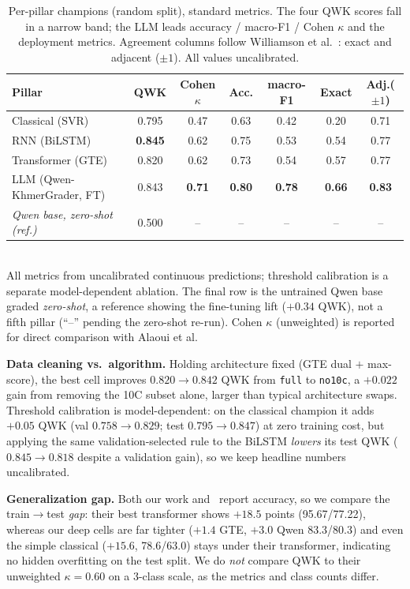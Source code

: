 \documentclass[journal]{IEEEtran}
\begin{document}
\begin{table}[t]
\caption{Per-pillar champions (random split), standard metrics. The four QWK scores fall in a
narrow band; the LLM leads accuracy / macro-F1 / Cohen $\kappa$ and the deployment metrics.
Agreement columns follow Williamson et al.~\cite{williamson2012framework}: exact and adjacent
($\pm1$). All values uncalibrated.}
\label{tab:champs}
\centering\small
\begin{tabular}{@{}lcccccc@{}}
\toprule
Pillar & QWK & Cohen $\kappa$ & Acc. & macro-F1 & Exact & Adj.($\pm1$) \\
\midrule
Classical (SVR) & 0.795 & 0.47 & 0.63 & 0.42 & 0.20 & 0.71 \\
RNN (BiLSTM)    & \textbf{0.845} & 0.62 & 0.75 & 0.53 & 0.54 & 0.77 \\
Transformer (GTE) & 0.820 & 0.62 & 0.73 & 0.54 & 0.57 & 0.77 \\
LLM (Qwen-KhmerGrader, FT) & 0.843 & \textbf{0.71} & \textbf{0.80} & \textbf{0.78} & \textbf{0.66} & \textbf{0.83} \\
\midrule
\emph{Qwen base, zero-shot (ref.)} & 0.500 & -- & -- & -- & -- & -- \\
\bottomrule
\end{tabular}
\\[2pt]
{\footnotesize All metrics from uncalibrated continuous predictions; threshold calibration is a
separate model-dependent ablation. The final row is the untrained Qwen base graded \emph{zero-shot},
a reference showing the fine-tuning lift ($+0.34$ QWK), not a fifth pillar (``--'' pending the
zero-shot re-run). Cohen $\kappa$ (unweighted) is reported for direct comparison with Alaoui et al.}
\end{table}

\textbf{Data cleaning vs.\ algorithm.} Holding architecture fixed (GTE dual $+$ max-score), the
best cell improves $0.820\!\to\!0.842$ QWK from \texttt{full} to \texttt{no10c}, a $+0.022$ gain from
removing the 10C subset alone, larger than typical architecture
swaps. Threshold calibration is model-dependent: on the classical champion it adds $+0.05$ QWK
(val $0.758\!\to\!0.829$; test $0.795\!\to\!0.847$) at zero training cost, but applying the same
validation-selected rule to the BiLSTM \emph{lowers} its test QWK ($0.845\!\to\!0.818$ despite a
validation gain), so we keep headline numbers uncalibrated.

\textbf{Generalization gap.} Both our work and~\cite{alaoui2024} report accuracy, so we compare
the train$\to$test \emph{gap}: their best transformer shows $+18.5$ points (95.67/77.22), whereas
our deep cells are far tighter ($+1.4$ GTE, $+3.0$ Qwen 83.3/80.3) and even the simple classical
($+15.6$, 78.6/63.0) stays under their transformer, indicating no hidden overfitting on the
test split. We do \emph{not} compare QWK to their unweighted $\kappa=0.60$ on a
3-class scale, as the metrics and class counts differ.
\end{document}
